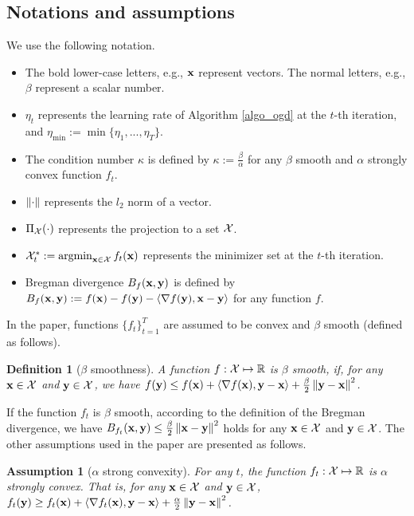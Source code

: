 \documentclass{article}
\newtheorem{Definition}{\bf{Definition}}
\newtheorem{Assumption}{\bf{Assumption}}
\begin{document}
\subsection{Notations and assumptions}
We use the following notation. 
\begin{itemize}
\item 
The bold lower-case letters, e.g., ${\bf x}$  represent vectors.  The normal letters, e.g., $\beta$ represent a scalar number.  %
\item $\eta_t$ represents the learning rate of Algorithm \ref{algo_ogd} at  the $t$-th iteration, and $\eta_{\min} := \min\{\eta_1, ..., \eta_T\}$. 
\item 
The condition number $\kappa$ is defined by $\kappa := \frac{\beta}{\alpha}$ for any  $\beta$ smooth and  $\alpha$ strongly convex  function $f_t$.  
\item 
$\left\lVert\cdot\right\rVert$ represents the $l_2$ norm of a vector.  
\item 
$\Pi_{\mathcal{X}}(\cdot)$ represents the projection to a set ${\mathcal{X}}$. 
\item $\Xcal_t^{\ast} := \argmin_{\x\in\Xcal} f_t(\x)$ represents the minimizer set at the $t$-th iteration. 
\item
Bregman divergence $B_f({\bf x},{\bf y})$ is defined by $ B_f({\bf x},{\bf y}) := f({\bf x}) - f({\bf y}) - \left\langle\nabla f({\bf y}), {\bf x} - {\bf y} \right\rangle$ for any function $f$.  
\end{itemize}

In the paper, functions $\{f_t\}_{t=1}^T$ are assumed to be convex and $\beta$ smooth (defined as follows).  
\begin{Definition}[$\beta$ smoothness]
\label{definition_f_t_smooth}
A function $f: {\mathcal{X}}\mapsto \mathbb{R}$ is $\beta$ smooth, if, for any ${\bf x}\in{\mathcal{X}}$ and ${\bf y}\in{\mathcal{X}}$, we have $f({\bf y})\le f({\bf x})+\left\langle\nabla f({\bf x}), {\bf y}-{\bf x} \right\rangle + \frac{\beta}{2}\left\lVert{\bf y} - {\bf x}\right\rVert^2$.
\end{Definition} If the function $f_t$ is $\beta$ smooth, according to the definition of the Bregman divergence, we have $B_{f_t}({\bf x},{\bf y}) \le \frac{\beta}{2}\left\lVert{\bf x} - {\bf y}\right\rVert^2$ holds for any ${\bf x}\in{\mathcal{X}}$ and ${\bf y}\in{\mathcal{X}}$. The other assumptions used in the paper are presented as follows.

\begin{Assumption}[$\alpha$ strong convexity]
\label{assumption_f_t_strongly_convex}
For any $t$, the function $f_t: {\mathcal{X}}\mapsto \mathbb{R}$ is $\alpha $ strongly convex. That is, for any ${\bf x}\in{\mathcal{X}}$ and ${\bf y}\in{\mathcal{X}}$, $f_t({\bf y})\ge f_t({\bf x})+\left\langle\nabla f_t({\bf x}), {\bf y}-{\bf x} \right\rangle + \frac{\alpha}{2}\left\lVert{\bf y} - {\bf x}\right\rVert^2$.
\end{Assumption}
\end{document}
